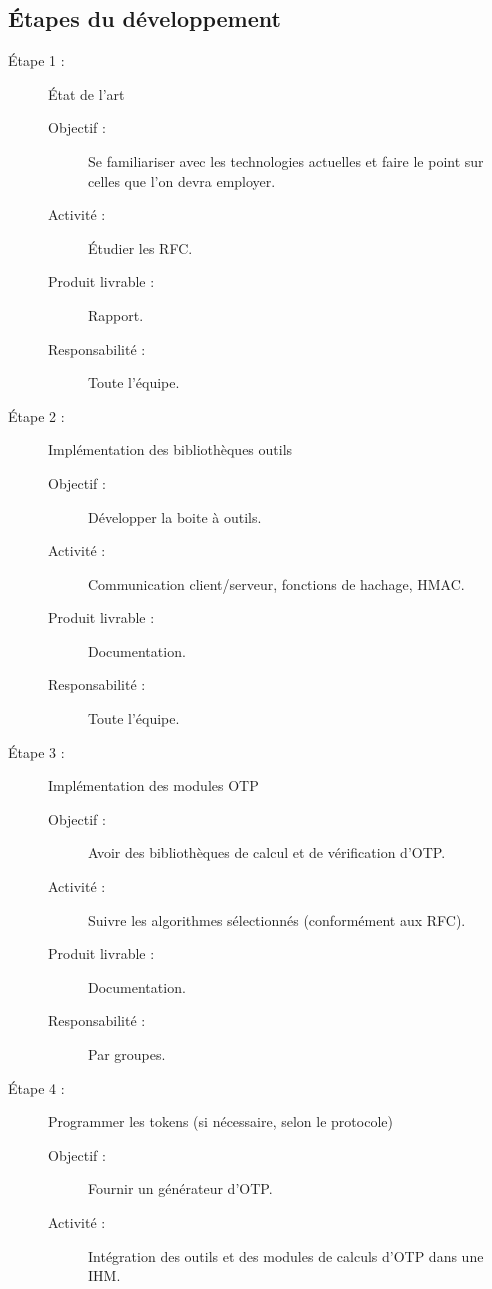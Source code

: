 \documentclass{../../res/univ-projet}
\begin{document}
\subsection{Étapes du développement}
	\begin{description}
	    \item [Étape 1 :] État de l'art
		    \begin{description}
		        \item [Objectif :] Se familiariser avec les technologies actuelles et faire le point sur celles que l'on devra employer.
		        \item [Activité :] Étudier les RFC.
		        \item [Produit livrable :] Rapport.
		        \item [Responsabilité :] Toute l'équipe.
            \end{description}
	    \item [Étape 2 :] Implémentation des bibliothèques outils
		    \begin{description}
		        \item [Objectif :] Développer la boite à outils.
		        \item [Activité :] Communication client/serveur, fonctions de hachage, HMAC.
		        \item [Produit livrable :] Documentation.
		        \item [Responsabilité :] Toute l'équipe.
		    \end{description}
	    \item [Étape 3 :] Implémentation des modules OTP
		    \begin{description}
		        \item [Objectif :] Avoir des bibliothèques de calcul et de vérification d'OTP.
		        \item [Activité :] Suivre les algorithmes sélectionnés (conformément aux RFC).
		        \item [Produit livrable :] Documentation.
		        \item [Responsabilité :] Par groupes.
		    \end{description}
	    \item [Étape 4 :] Programmer les tokens (si nécessaire, selon le protocole)
		    \begin{description}
		        \item [Objectif :] Fournir un générateur d'OTP.
		        \item [Activité :] Intégration des outils et des modules de calculs d'OTP dans une IHM.

\end{description}
\end{description}
\end{document}
